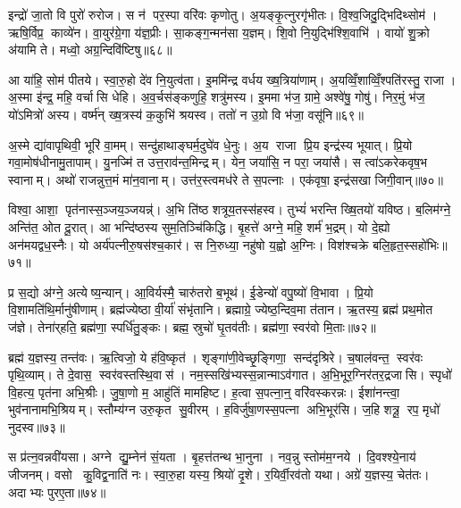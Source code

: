 इन्द्रो॑ जा॒तो वि पुरो॑ रुरोज। स न॑ पर॒स्पा वरि॑वः कृणोतु। अ॒यङ्कृ॒त्नुरगृ॑भीतः। वि॒श्व॒जिदु॒द्भिदिथ्सोम॑। ऋषि॒र्विप्र॒ काव्ये॑न। वा॒युर॑ग्रे॒गा य॑ज्ञ॒प्रीः। सा॒कङ्ग॒न्मन॑सा य॒ज्ञम्। शि॒वो नि॒युद्भि॑श्शि॒वाभि॑। वायो॑ शु॒क्रो अ॑यामि ते। मध्वो॒ अग्र॒न्दिवि॑ष्टिषु॥६८॥

आ या॑हि॒ सोम॑ पीतये। स्वा॒रु॒हो दे॑व नि॒युत्व॑ता। इ॒ममि॑न्द्र वर्धय ख्ष॒त्रिया॑णाम्। अ॒यव्विँ॒शाव्विँ॒श्पति॑रस्तु॒ राजा। अ॒स्मा इ॑न्द्र॒ महि॒ वर्चासि धेहि। अ॒व॒र्चस॑ङ्कणुहि॒ शत्रु॑मस्य। इ॒ममा भ॑ज॒ ग्रामे॒ अश्वे॑षु॒ गोषु॑। निर॒मुं भ॑ज॒ यो॑ऽमित्रो॑ अस्य। वर्ष्म॑न् ख्ष॒त्रस्य॑ क॒कुभि॑ श्रयस्व। ततो॑ न उ॒ग्रो वि भ॑जा॒ वसू॑नि॥६९॥

अ॒स्मे द्या॑वापृथिवी॒ भूरि॑ वा॒मम्। सन्दु॑हाथाङ्घर्म॒दुघे॑व धे॒नुः। अ॒य राजा प्रि॒य इन्द्र॑स्य भूयात्। प्रि॒यो गवा॒मोष॑धीनामु॒तापाम्। यु॒नज्मि॑ त उत्त॒राव॑न्त॒मिन्द्रम्। येन॒ जया॑सि॒ न परा॒ जया॑सै। स त्वा॑ऽकरेकवृष॒भ स्वानाम्। अथो॑ राजन्नुत्त॒मं मा॑न॒वानाम्। उत्त॑र॒स्त्वमध॑रे ते स॒पत्नाः। एक॑वृषा॒ इन्द्र॑सखा जिगी॒वान्॥७०॥

विश्वा॒ आशा॒ पृत॑नास्स॒ञ्जय॒ञ्जयन्न्॑। अ॒भि ति॑ष्ठ शत्रूय॒तस्स॑हस्व। तुभ्यं॑ भरन्ति ख्षि॒तयो॑ यविष्ठ। ब॒लिम॑ग्ने॒ अन्ति॑त॒ ओत दू॒रात्। आ भन्दि॑ष्ठस्य सुम॒तिञ्चि॑किद्धि। बृ॒हत्ते॑ अग्ने॒ महि॒ शर्म॑ भ॒द्रम्। यो दे॒ह्यो अन॑मयद्वध॒स्नैः। यो अर्य॑पत्नीरु॒षस॑श्च॒कार॑। स नि॒रुध्या॒ नहु॑षो य॒ह्वो अ॒ग्निः। विश॑श्चक्रे बलि॒हृत॒स्सहो॑भिः॥७१॥

प्र स॒द्यो अ॑ग्ने॒ अत्येष्य॒न्यान्। आ॒विर्यस्मै॒ चारु॑तरो ब॒भूथ॑। ई॒डेन्यो॑ वपु॒ष्यो॑ वि॒भावा। प्रि॒यो वि॒शामति॑थि॒र्मानु॑षीणाम्। ब्रह्म॑ज्येष्ठा वी॒र्या॑ संभृ॑तानि। ब्रह्माग्रे॒ ज्येष्ठ॒न्दिव॒मा त॑तान। ऋ॒तस्य॒ ब्रह्म॑ प्रथ॒मोत ज॑ज्ञे। तेना॑र्‌हति॒ ब्रह्म॑णा॒ स्पर्धि॑तु॒ङ्कः। ब्रह्म॒ स्रुचो॑ घृ॒तव॑तीः। ब्रह्म॑णा॒ स्वर॑वो मि॒ताः॥७२॥

ब्रह्म॑ य॒ज्ञस्य॒ तन्त॑वः। ऋ॒त्विजो॒ ये ह॑वि॒ष्कृत॑। शृङ्गा॑णी॒वेच्छृ॒ङ्गिणा॒ सन्द॑दृश्रिरे। च॒षाल॑वन्त॒ स्वर॑वः पृथि॒व्याम्। ते दे॒वास॒ स्वर॑वस्तस्थि॒वास॑। नम॒स्सखि॑भ्यस्स॒न्नान्माऽव॑गात। अ॒भि॒भूर॒ग्निर॑तर॒द्रजासि। स्पृधो॑ वि॒हत्य॒ पृत॑ना अभि॒श्रीः। जु॒षा॒णो म॒ आहु॑तिं मामहिष्ट। ह॒त्वा स॒पत्ना॒न्॒ वरि॑वस्करन्नः। ईशा॑नन्त्वा॒ भुव॑नानामभि॒श्रियम्। स्तौम्य॑ग्न उरु॒कृत सु॒वीरम्। ह॒विर्जु॑षा॒णस्स॒पत्ना अभि॒भूर॑सि। ज॒हि शत्रू॒ रप॒ मृधो॑ नुदस्व॥७३॥\anuvakamend[वि॒शाञ्ज॑यामसि जीरदानो॒ हर्या॒ विश्वा॒ दिवि॑ष्टिषु॒ वसू॑नि जिगी॒वान्थ्सहो॑भिर्मि॒ता न॑श्च॒त्वारि॑ च]

स प्र॑त्न॒वन्नवी॑यसा। अग्ने द्यु॒म्नेन॑ सं॒यता। बृ॒हत्त॑तन्थ भा॒नुना। नव॒न्नु स्तोम॑म॒ग्नये। दि॒वश्श्ये॒नाय॑ जीजनम्। वसो कु॒विद्व॒नाति॑ नः। स्वा॒रु॒हा यस्य॒ श्रियो॑ दृ॒शे। र॒यिर्वी॒रव॑तो यथा। अग्रे॑ य॒ज्ञस्य॒ चेत॑तः। अदाभ्यः पुरए॒ता॥७४॥

